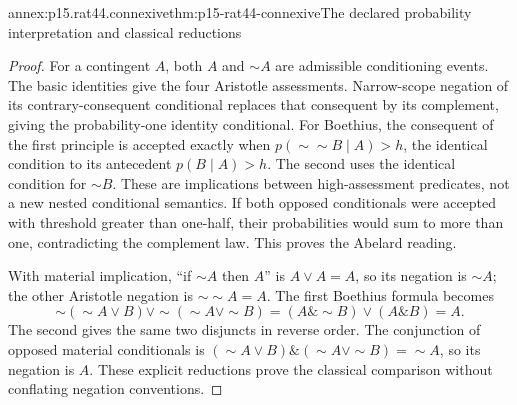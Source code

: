 \begin{annexitem}{annex:p15.rat44.connexive}{thm:p15-rat44-connexive}{The declared probability interpretation and classical reductions}
\begin{proof}
For a contingent \(A\), both \(A\) and \(\sim A\) are admissible
conditioning events. The basic identities give the four Aristotle
assessments. Narrow-scope negation of its contrary-consequent
conditional replaces that consequent by its complement, giving the
probability-one identity conditional. For Boethius, the consequent of
the first principle is accepted exactly when
\(p(\sim\sim B\mid A)>h\), the identical condition to its
antecedent \(p(B\mid A)>h\). The second uses the identical
condition for \(\sim B\). These are implications between
high-assessment predicates, not a new nested conditional semantics.
If both opposed conditionals were accepted with threshold greater
than one-half, their probabilities would sum to more than one,
contradicting the complement law. This proves the Abelard reading.

With material implication, ``if \(\sim A\) then \(A\)'' is
\(A\lor A=A\), so its negation is \(\sim A\); the other
Aristotle negation is \(\sim\sim A=A\). The first Boethius
formula becomes
\[
 \sim(\sim A\lor B)\lor\sim(\sim A\lor\sim B)
 =(A\mathbin{\&}\sim B)\lor(A\mathbin{\&}B)=A.
\]
The second gives the same two disjuncts in reverse order. The
conjunction of opposed material conditionals is
\((\sim A\lor B)\mathbin{\&}(\sim A\lor\sim B)=\sim A\),
so its negation is \(A\). These explicit reductions prove the
classical comparison without conflating negation conventions.
\end{proof}
\end{annexitem}

